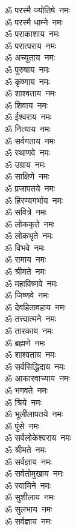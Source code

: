 \begin{multicols}{2}
\begin{flushleft}
ॐ परस्मै ज्योतिषे~नमः\\
ॐ परस्मै धाम्ने~नमः\\
ॐ पराकाशाय~नमः\\
ॐ परात्पराय~नमः\\
ॐ अच्युताय~नमः\\
ॐ पुरुषाय~नमः\\
ॐ कृष्णाय~नमः\hfill{}\\
ॐ शाश्वताय~नमः\\
ॐ शिवाय~नमः\\
ॐ ईश्वराय~नमः\\
ॐ नित्याय~नमः\\
ॐ सर्वगताय~नमः\\
ॐ स्थाणवे~नमः\\
ॐ उग्राय~नमः\\
ॐ साक्षिणे~नमः\\
ॐ प्रजापतये~नमः\\
ॐ हिरण्यगर्भाय~नमः\hfill{}\\
ॐ सवित्रे~नमः\\
ॐ लोककृते~नमः\\
ॐ लोकभृते~नमः\\
ॐ विभवे~नमः\\
ॐ रामाय~नमः\\
ॐ श्रीमते~नमः\\
ॐ महाविष्णवे~नमः\\
ॐ जिष्णवे~नमः\\
ॐ देवहितावहाय~नमः\\
ॐ तत्त्वात्मने~नमः\hfill{}\\
ॐ तारकाय~नमः\\
ॐ ब्रह्मणे~नमः\\
ॐ शाश्वताय~नमः\\
ॐ सर्वसिद्धिदाय~नमः\\
ॐ आकारवाच्याय~नमः\\
ॐ भगवते~नमः\\
ॐ श्रिये~नमः\\
ॐ भूलीलापतये~नमः\\
ॐ पुंसे~नमः\\
ॐ सर्वलोकेश्वराय~नमः\hfill{}\\
ॐ श्रीमते~नमः\\
ॐ सर्वज्ञाय~नमः\\
ॐ सर्वतोमुखाय~नमः\\
ॐ स्वामिने~नमः\\
ॐ सुशीलाय~नमः\\
ॐ सुलभाय~नमः\\
ॐ सर्वज्ञाय~नमः\\

\end{flushleft}
\end{multicols}
